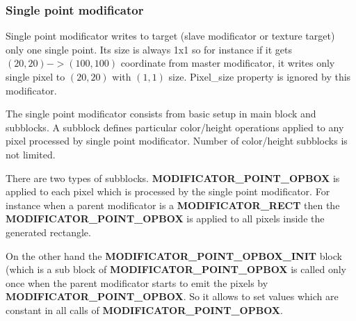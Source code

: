 \documentclass[9pt]{article}
\begin{document}
\subsubsection{Single point modificator}

Single point modificator writes to target (slave modificator
or texture target) only one single point. Its size is always 1x1 so for instance
if it gets \begin{math}(20,20) -> (100,100)\end{math} coordinate 
from master modificator, it writes only single pixel to \begin{math}(20,20)\end{math} 
with \begin{math}(1,1)\end{math} size. Pixel\_size property is ignored 
by this modificator.

The single point modificator consists from basic setup in main block and
subblocks. A subblock defines particular color/height operations applied to 
any pixel processed by single point modificator. Number of color/height 
subblocks is not limited.

There are two types of subblocks. {\bf MODIFICATOR\_POINT\_OPBOX} is applied to 
each pixel which is processed by the single point modificator. For instance when 
a parent modificator is a {\bf MODIFICATOR\_RECT} then the {\bf MODIFICATOR\_POINT\_OPBOX}
is applied to all pixels inside the generated rectangle.

On the other hand the {\bf MODIFICATOR\_POINT\_OPBOX\_INIT} block (which is a sub block of 
{\bf MODIFICATOR\_POINT\_OPBOX} is called only once when the parent modificator
starts to emit the pixels by {\bf MODIFICATOR\_POINT\_OPBOX}. So it allows to set 
values which are constant in all calls of {\bf MODIFICATOR\_POINT\_OPBOX}.
\end{document}
